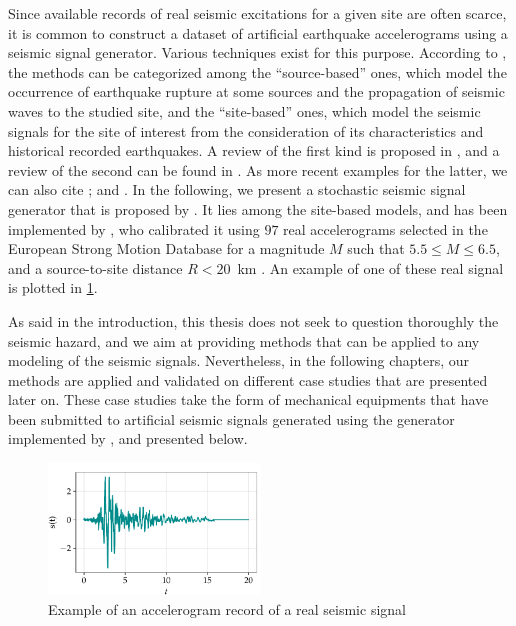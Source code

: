 


Since available records of real seismic excitations for a given site are often scarce, it is common to construct a dataset of artificial earthquake accelerograms using a seismic signal generator.
Various techniques exist for this purpose. According to \citet{rezaeian_stochastic_2008}, the methods can be categorized among the ``source-based'' ones, which model the occurrence of
earthquake rupture at some sources and the propagation of seismic waves to the studied site, and the ``site-based'' ones, which model the seismic signals for the site of interest from the consideration of its characteristics and historical recorded earthquakes.
A review of the first kind is proposed in \cite{zerva_seismic_1988}, and a review of the second can be found in \cite{shinozuka_stochastic_1988}.
As more recent examples for the latter, we can also cite \cite{trevlopoulos_parametric_2019}; and \cite{zentner_enrichment_2012}.
In the following, we present a stochastic seismic signal generator that is proposed by \citet{rezaeian_simulation_2010}. It lies among the site-based models, and has been implemented by \citet{sainct_efficient_2020}, who calibrated it using $97$ real accelerograms selected in the European Strong Motion Database  for a magnitude $M$ such that $5.5 \leq M \leq 6.5$, and a source-to-site distance $R < 20$~km \citep{ambraseys_dissemination_2000}.  An example of one of these real signal is plotted in 
\cref{fig:intro-frags:real-seism}.




As said in the introduction, this thesis does not seek to question thoroughly the seismic hazard, and we aim at providing methods that can be applied to any modeling of the seismic signals. Nevertheless, in the following chapters, our methods are applied and validated on different case studies that are presented later on. These case studies take the form of mechanical equipments that have been submitted to artificial seismic signals generated using the generator implemented by \citet{sainct_efficient_2020}, and presented below.


\begin{figure}[h]
    \centering
    \includegraphics[width=5.625cm]{figures/intro-frags/exseism.pdf}
    \caption{Example of an accelerogram record of a real seismic signal} %
    \label{fig:intro-frags:real-seism}
\end{figure}


